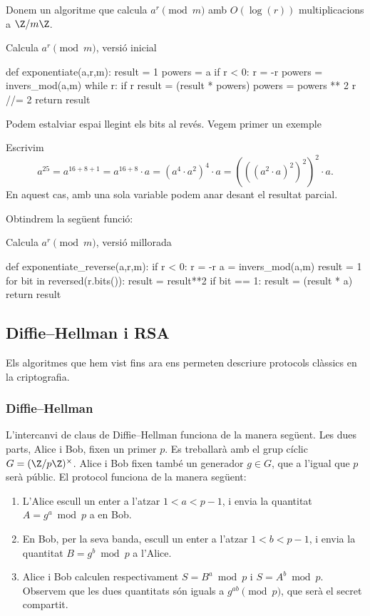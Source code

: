  Donem un algoritme que calcula $a^r\pmod{m}$ amb $O(\log(r))$ multiplicacions a $\Z/m\Z$.
 
 \begin{algorithm}
 \caption{Calcula $a^r\pmod m$, versió inicial}
\begin{python}
def exponentiate(a,r,m):
    result = 1
    powers = a %
    if r < 0:
        r = -r
        powers = invers_mod(a,m)
    while r:
        if r %
            result = (result * powers) %
        powers = powers ** 2 %
        r //= 2
    return result
\end{python}
  \end{algorithm}
  
 Podem estalviar espai llegint els bits al revés. Vegem primer un exemple
 \begin{example}
 Escrivim
 \[
 a^{25} = a^{16+8+1} = a^{16+8}\cdot a = (a^{4}\cdot a^2)^4\cdot a = (((a^2\cdot a)^2)^2)^2\cdot a.
 \]
 En aquest cas, amb una sola variable podem anar desant el resultat parcial.
 \end{example}
 
 Obtindrem la següent funció:
  \begin{algorithm}
 \caption{Calcula $a^r\pmod m$, versió millorada}
 \begin{python}
def exponentiate_reverse(a,r,m):
    if r < 0:
        r = -r
        a = invers_mod(a,m)
    result = 1
    for bit in reversed(r.bits()):
        result = result**2 %
        if bit == 1:
            result = (result * a) %
    return result
 \end{python}
 \end{algorithm}
 
\subsection{Diffie--Hellman i RSA}
Els algoritmes que hem vist fins ara ens permeten descriure protocols clàssics en la criptografia.

\subsubsection{Diffie--Hellman}
\label{sec:diffie-hellman}
L'intercanvi de claus de Diffie--Hellman  funciona de la manera següent. Les dues parts, Alice i Bob, fixen un primer $p$. Es treballarà amb el grup cíclic $G = (\Z/p\Z)^\times$. Alice i Bob fixen també un generador $g\in G$, que a l'igual que $p$ serà públic. El protocol funciona de la manera següent:
\begin{enumerate}
    \item L'Alice escull un enter a l'atzar $1<a<p-1$, i envia la quantitat $A=g^a\bmod{p}$ a en Bob.
    \item En Bob, per la seva banda, escull un enter a l'atzar $1<b<p-1$, i envia la quantitat $B=g^b\bmod{p}$ a l'Alice.
    \item Alice i Bob calculen respectivament $S=B^a\bmod{p}$ i $S=A^b\bmod{p}$. Observem que les dues quantitats són iguals a $g^{ab}\pmod{p}$, que serà el secret compartit.
\end{enumerate}

